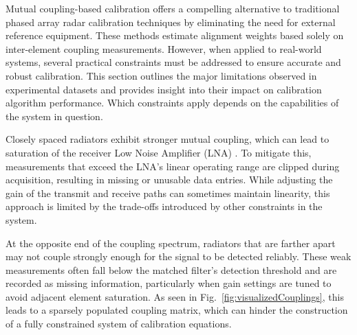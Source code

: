 \documentclass[journal]{IEEEtran}
\begin{document}
Mutual coupling-based calibration offers a compelling alternative to traditional phased array radar calibration techniques by eliminating the need for external reference equipment. These methods estimate alignment weights based solely on inter-element coupling measurements. However, when applied to real-world systems, several practical constraints must be addressed to ensure accurate and robust calibration. This section outlines the major limitations observed in experimental datasets and provides insight into their impact on calibration algorithm performance. Which constraints apply depends on the capabilities of the system in question.


Closely spaced radiators exhibit stronger mutual coupling, which can lead to saturation of the receiver Low Noise Amplifier (LNA) \cite{jablon}. To mitigate this, measurements that exceed the LNA’s linear operating range are clipped during acquisition, resulting in missing or unusable data entries. While adjusting the gain of the transmit and receive paths can sometimes maintain linearity, this approach is limited by the trade-offs introduced by other constraints in the system.


At the opposite end of the coupling spectrum, radiators that are farther apart may not couple strongly enough for the signal to be detected reliably. These weak measurements often fall below the matched filter's detection threshold and are recorded as missing information, particularly when gain settings are tuned to avoid adjacent element saturation. As seen in Fig.~\ref{fig:visualizedCouplings}, this leads to a sparsely populated coupling matrix, which can hinder the construction of a fully constrained system of calibration equations.  

\end{document}
